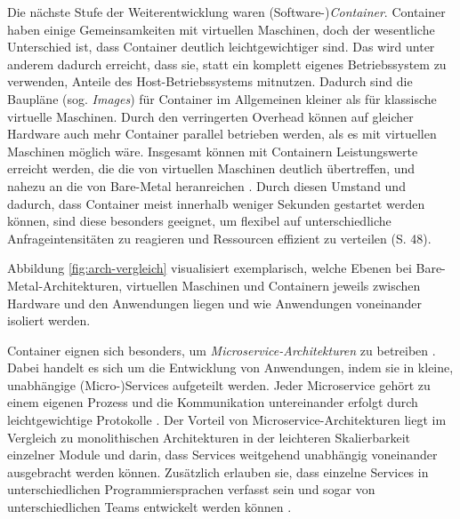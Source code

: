 \documentclass[11pt,a4paper]{article}
\begin{document}
Die nächste Stufe der Weiterentwicklung waren (Software-)\emph{Container}. Container haben einige Gemeinsamkeiten mit virtuellen Maschinen, doch der wesentliche Unterschied ist,
dass Container deutlich leichtgewichtiger sind. Das wird unter anderem dadurch erreicht, dass sie, statt ein komplett eigenes Betriebssystem zu verwenden,
Anteile des Host-Betriebssystems mitnutzen. Dadurch sind die Baupläne (sog. \emph{Images}) für Container im Allgemeinen kleiner als für klassische virtuelle Maschinen.
Durch den verringerten Overhead können auf gleicher Hardware auch mehr Container parallel betrieben werden, als es mit virtuellen Maschinen möglich wäre.
Insgesamt können mit Containern Leistungswerte erreicht werden, die die von virtuellen Maschinen deutlich übertreffen,
und nahezu an die von Bare-Metal heranreichen \cite{1272998.1273025}.
Durch diesen Umstand und dadurch, dass Container meist innerhalb weniger Sekunden gestartet werden können, sind diese besonders geeignet,
um flexibel auf unterschiedliche Anfrageintensitäten zu reagieren und Ressourcen effizient zu verteilen \cite{kofler2021docker} (S. 48).

Abbildung \ref{fig:arch-vergleich} visualisiert exemplarisch, welche Ebenen bei Bare-Metal-Architekturen, virtuellen Maschinen und Containern
jeweils zwischen Hardware und den Anwendungen liegen und wie Anwendungen voneinander isoliert werden.


Container eignen sich besonders, um \emph{Microservice-Architekturen} zu betreiben \cite{7158965}. Dabei handelt es sich um die
Entwicklung von Anwendungen, indem sie in kleine, unabhängige (Micro-)Services aufgeteilt werden. Jeder Microservice gehört zu
einem eigenen Prozess und die Kommunikation untereinander erfolgt durch leichtgewichtige Protokolle \cite{8406008}.
Der Vorteil von Microservice-Architekturen liegt im Vergleich zu monolithischen Architekturen in der
leichteren Skalierbarkeit einzelner Module und darin, dass Services weitgehend unabhängig voneinander
ausgebracht werden können. Zusätzlich erlauben sie, dass einzelne Services in unterschiedlichen Programmiersprachen
verfasst sein und sogar von unterschiedlichen Teams entwickelt werden können \cite{microservices}.
\end{document}
